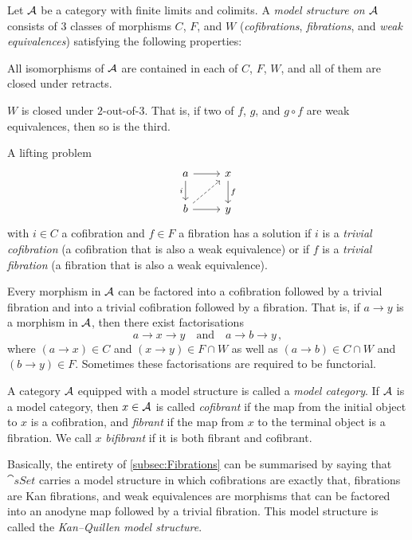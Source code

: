 \begin{defi}\label{def:ModelCategory}
	Let $\mathcal{A}$ be a category with finite limits and colimits. A \emph{model structure on $\mathcal{A}$} consists of 3 classes of morphisms $C$, $F$, and $W$ (\emph{cofibrations}, \emph{fibrations}, and \emph{weak equivalences}) satisfying the following properties:
	\begin{alphanumerate}
		\item All isomorphisms of $\mathcal{A}$ are contained in each of $C$, $F$, $W$, and all of them are closed under retracts.
		\item $W$ is closed under $2$-out-of-$3$. That is, if two of $f$, $g$, and $g\circ f$ are weak equivalences, then so is the third.
		\item A lifting problem
		\begin{equation*}
			\begin{tikzcd}
				a\rar\dar["i"'] & x\dar["f"]\\
				b\urar[dashed]\rar & y
			\end{tikzcd}
		\end{equation*}
		with $i\in C$ a cofibration and $f\in F$ a fibration has a solution if $i$ is a \emph{trivial cofibration} (a cofibration that is also a weak equivalence) or if $f$ is a \emph{trivial fibration} (a fibration that is also a weak equivalence).
		\item Every morphism in $\mathcal{A}$ can be factored into a cofibration followed by a trivial fibration and into a trivial cofibration followed by a fibration. That is, if $a\rightarrow y$ is a morphism in $\mathcal{A}$, then there exist factorisations
		\begin{equation*}
			a\longrightarrow x\longrightarrow y\quad\text{and}\quad a\longrightarrow b\longrightarrow y\,,
		\end{equation*}
		where $(a\rightarrow x)\in C$ and $(x\rightarrow y)\in F\cap W$ as well as $(a\rightarrow b)\in C\cap W$ and $(b\rightarrow y)\in F$. Sometimes these factorisations are required to be functorial.
	\end{alphanumerate}
	A category $\mathcal{A}$ equipped with a model structure is called a \emph{model category}. If $\mathcal{A}$ is a model category, then $x\in \mathcal{A}$ is called \emph{cofibrant} if the map from the initial object to $x$ is a cofibration, and \emph{fibrant} if the map from $x$ to the terminal object is a fibration. We call $x$ \emph{bifibrant} if it is both fibrant and cofibrant.
\end{defi}
\begin{exm}\label{exm:KanQuillenModelStructure}
	Basically, the entirety of \cref{subsec:Fibrations} can be summarised by saying that $\cat{sSet}$ carries a model structure in which cofibrations are exactly that, fibrations are Kan fibrations, and weak equivalences are morphisms that can be factored into an anodyne map followed by a trivial fibration. This model structure is called the \emph{Kan--Quillen model structure}.
\end{exm}
